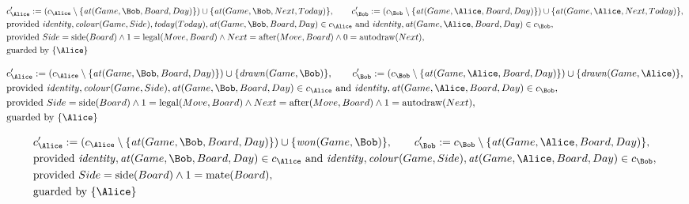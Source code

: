 \begin{align*}
&
c'_
{
\Alice
}
 := 
(c_
{
\Alice
}
 \setminus 
\{
\mathit{\detokenize{
at
}}
(
Game
,
\Bob
,
Board
,
Day
)
\}
) \cup 
\{
\mathit{\detokenize{
at
}}
(
Game
,
\Bob
,
Next
,
Today
)
\}
, \qquad 
c'_
{
\Bob
}
 := 
(c_
{
\Bob
}
 \setminus 
\{
\mathit{\detokenize{
at
}}
(
Game
,
\Alice
,
Board
,
Day
)
\}
) \cup 
\{
\mathit{\detokenize{
at
}}
(
Game
,
\Alice
,
Next
,
Today
)
\}
,\\
&
\text{provided } 
\mathit{\detokenize{
identity
}}
,
\mathit{\detokenize{
colour
}}
(
Game
,
Side
)
,
\mathit{\detokenize{
today
}}
(
Today
)
,
\mathit{\detokenize{
at
}}
(
Game
,
\Bob
,
Board
,
Day
)
 \in c_
{
\Alice
}
 \text{ and } 
\mathit{\detokenize{
identity
}}
,
\mathit{\detokenize{
at
}}
(
Game
,
\Alice
,
Board
,
Day
)
 \in c_
{
\Bob
}
,\\
&
\text{provided } 
Side
=
\mathrm{
side
}(
Board
)
\land
1
=
\mathrm{
legal
}(
Move
,
Board
)
\land
Next
=
\mathrm{
after
}(
Move
,
Board
)
\land
0
=
\mathrm{
autodraw
}(
Next
)
,\\
&
\text{guarded by } \{
\Alice
\}
\end{align*}

\begin{align*}
&
c'_
{
\Alice
}
 := 
(c_
{
\Alice
}
 \setminus 
\{
\mathit{\detokenize{
at
}}
(
Game
,
\Bob
,
Board
,
Day
)
\}
) \cup 
\{
\mathit{\detokenize{
drawn
}}
(
Game
,
\Bob
)
\}
, \qquad 
c'_
{
\Bob
}
 := 
(c_
{
\Bob
}
 \setminus 
\{
\mathit{\detokenize{
at
}}
(
Game
,
\Alice
,
Board
,
Day
)
\}
) \cup 
\{
\mathit{\detokenize{
drawn
}}
(
Game
,
\Alice
)
\}
,\\
&
\text{provided } 
\mathit{\detokenize{
identity
}}
,
\mathit{\detokenize{
colour
}}
(
Game
,
Side
)
,
\mathit{\detokenize{
at
}}
(
Game
,
\Bob
,
Board
,
Day
)
 \in c_
{
\Alice
}
 \text{ and } 
\mathit{\detokenize{
identity
}}
,
\mathit{\detokenize{
at
}}
(
Game
,
\Alice
,
Board
,
Day
)
 \in c_
{
\Bob
}
,\\
&
\text{provided } 
Side
=
\mathrm{
side
}(
Board
)
\land
1
=
\mathrm{
legal
}(
Move
,
Board
)
\land
Next
=
\mathrm{
after
}(
Move
,
Board
)
\land
1
=
\mathrm{
autodraw
}(
Next
)
,\\
&
\text{guarded by } \{
\Alice
\}
\end{align*}

\begin{align*}
&
c'_
{
\Alice
}
 := 
(c_
{
\Alice
}
 \setminus 
\{
\mathit{\detokenize{
at
}}
(
Game
,
\Bob
,
Board
,
Day
)
\}
) \cup 
\{
\mathit{\detokenize{
won
}}
(
Game
,
\Bob
)
\}
, \qquad 
c'_
{
\Bob
}
 := 
c_
{
\Bob
}
 \setminus 
\{
\mathit{\detokenize{
at
}}
(
Game
,
\Alice
,
Board
,
Day
)
\}
,\\
&
\text{provided } 
\mathit{\detokenize{
identity
}}
,
\mathit{\detokenize{
at
}}
(
Game
,
\Bob
,
Board
,
Day
)
 \in c_
{
\Alice
}
 \text{ and } 
\mathit{\detokenize{
identity
}}
,
\mathit{\detokenize{
colour
}}
(
Game
,
Side
)
,
\mathit{\detokenize{
at
}}
(
Game
,
\Alice
,
Board
,
Day
)
 \in c_
{
\Bob
}
,\\
&
\text{provided } 
Side
=
\mathrm{
side
}(
Board
)
\land
1
=
\mathrm{
mate
}(
Board
)
,\\
&
\text{guarded by } \{
\Alice
\}
\end{align*}
